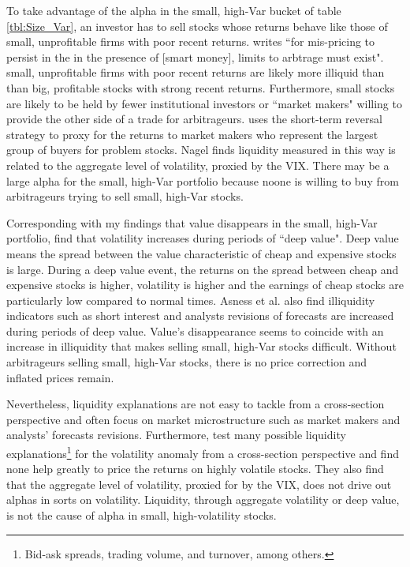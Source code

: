To take advantage of the alpha in the small, high-Var bucket of table
\ref{tbl:Size_Var}, an investor has to sell stocks whose returns behave
like those of small, unprofitable firms with poor recent returns.
\textcite{nagel2005short} writes ``for mis-pricing to persist in the in the
presence of [smart money], limits to arbtrage must exist".
small, unprofitable firms with poor recent returns are likely more illiquid
than than big, profitable stocks with strong recent returns.
Furthermore, small stocks are likely to be held by fewer institutional
investors or ``market makers" willing to provide the other side of a trade for
arbitrageurs.
\textcite{nagel2012evaporating} uses the short-term reversal strategy to proxy
for the returns to market makers who represent the largest group of buyers for
problem stocks.
Nagel finds liquidity measured in this way is related to the aggregate level
of volatility, proxied by the VIX.
There may be a large alpha for the small, high-Var portfolio because noone is
willing to buy from arbitrageurs trying to sell small, high-Var stocks.

Corresponding with my findings that value disappears in the small, high-Var
portfolio, \textcite{asness2018deep} find that volatility increases during
periods of ``deep value".
Deep value means the spread between the value characteristic of cheap and
expensive stocks is large.
During a deep value event, the returns on the spread between cheap and
expensive stocks is higher, volatility is higher and the earnings of cheap
stocks are particularly low compared to normal times.
Asness et al. also find illiquidity indicators such as short interest and
analysts revisions of forecasts are increased during periods of deep value.
Value's disappearance seems to coincide with an increase in illiquidity that
makes selling small, high-Var stocks difficult.
Without arbitrageurs selling small, high-Var stocks, there is no price
correction and inflated prices remain.

Nevertheless, liquidity explanations are not easy to tackle from a
cross-section perspective and often focus on market microstructure such as
market makers and analysts' forecasts revisions.
Furthermore, \textcite{ang2006cross} test many possible liquidity
explanations\footnote{Bid-ask spreads, trading volume, and
turnover, among others.} for the volatility anomaly from a cross-section perspective
and find none help greatly to price the returns on highly volatile stocks.
They also find that the aggregate level of volatility, proxied for by the VIX,
does not drive out alphas in sorts on volatility.
Liquidity, through aggregate volatility or deep value, is not the cause of
alpha in small, high-volatility stocks.

